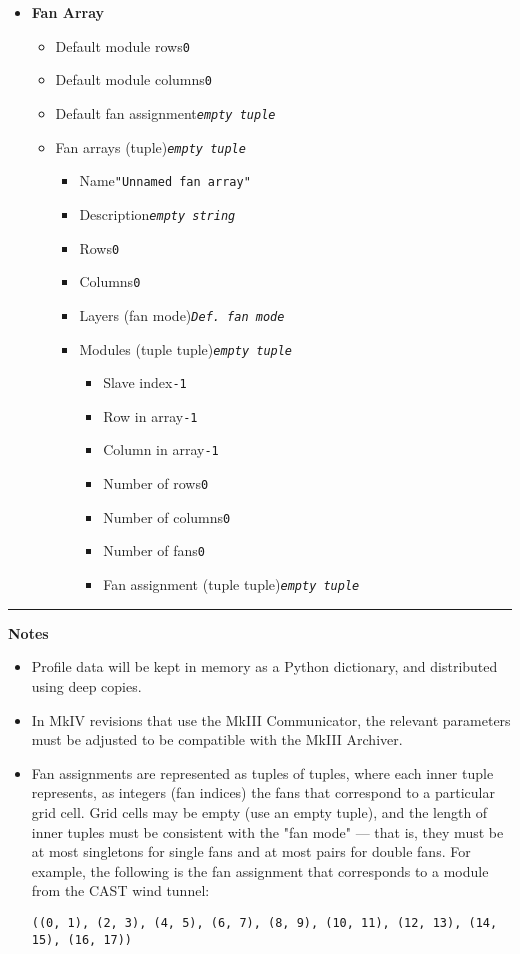 \documentclass{article}
\newcommand{\dt}[1]{\dotfill \texttt{#1}}
\newcommand{\vp}{\vspace{1em}}
\newcommand{\et}{\textit{empty tuple}}
\newcommand{\es}{\textit{empty string}}
\begin{document}
\begin{multicols}{2}
\begin{itemize}
\item \textbf{Fan Array}

    \begin{itemize}

    \item Default module rows\dt{0}
    \item Default module columns\dt{0}
    \item Default fan assignment\dt{\et}
    \vp
    \item Fan arrays (tuple)\dt{\et}
    \begin{itemize}
        \item Name\dt{"Unnamed fan array"}
        \item Description\dt{\es}
        \item Rows\dt{0}
        \item Columns\dt{0}
        \item Layers (fan mode)\dt{\textit{Def. fan mode}}
        \item Modules (tuple tuple)\dt{\et}
            \begin{itemize}
                \item Slave index\dt{-1}
                \item Row in array\dt{-1}
                \item Column in array\dt{-1}
                \item Number of rows\dt{0}
                \item Number of columns\dt{0}
                \item Number of fans\dt{0}
                \item Fan assignment (tuple tuple)\dt{\et}
            \end{itemize}
    \end{itemize}

    \end{itemize}

\end{itemize}

\end{multicols}
\vp
\hrule
\vp
\textbf{\large Notes}

\begin{itemize}
\item Profile data will be kept in memory as a Python dictionary, and
    distributed using deep copies.
\item In MkIV revisions that use the MkIII Communicator, the relevant
    parameters must be adjusted to be compatible with the MkIII Archiver.
\item Fan assignments are represented as tuples of tuples, where each inner
    tuple represents, as integers (fan indices) the fans that correspond to
    a particular grid cell. Grid cells may be empty (use an empty tuple), and
    the length of inner tuples must be consistent with the "fan mode" --- that
    is, they must be at most singletons for single fans and at most pairs for
    double fans.
    For example, the following is the fan assignment that corresponds to a
    module from the CAST wind tunnel:

    \texttt{((0, 1), (2, 3), (4, 5), (6, 7), (8, 9), (10, 11),
        (12, 13), (14, 15), (16, 17))}
\end{itemize}
\end{document}
